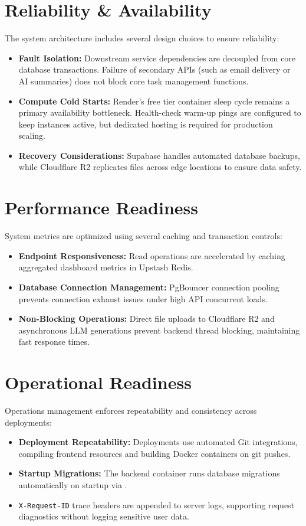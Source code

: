 \section{Reliability \& Availability}
The system architecture includes several design choices to ensure reliability:
\begin{itemize}
    \item \textbf{Fault Isolation:} Downstream service dependencies are decoupled from core database transactions. Failure of secondary APIs (such as email delivery or AI summaries) does not block core task management functions.
    \item \textbf{Compute Cold Starts:} Render's free tier container sleep cycle remains a primary availability bottleneck. Health-check warm-up pings are configured to keep instances active, but dedicated hosting is required for production scaling.
    \item \textbf{Recovery Considerations:} Supabase handles automated database backups, while Cloudflare R2 replicates files across edge locations to ensure data safety.
\end{itemize}

\section{Performance Readiness}
System metrics are optimized using several caching and transaction controls:
\begin{itemize}
    \item \textbf{Endpoint Responsiveness:} Read operations are accelerated by caching aggregated dashboard metrics in Upstash Redis.
    \item \textbf{Database Connection Management:} PgBouncer connection pooling prevents connection exhaust issues under high API concurrent loads.
    \item \textbf{Non-Blocking Operations:} Direct file uploads to Cloudflare R2 and asynchronous LLM generations prevent backend thread blocking, maintaining fast response times.
\end{itemize}

\section{Operational Readiness}
Operations management enforces repeatability and consistency across deployments:
\begin{itemize}
    \item \textbf{Deployment Repeatability:} Deployments use automated Git integrations, compiling frontend resources and building Docker containers on git pushes.
    \item \textbf{Startup Migrations:} The backend container runs database migrations automatically on startup via .
    \item \texttt{X-Request-ID} trace headers are appended to server logs, supporting request diagnostics without logging sensitive user data.
\end{itemize}

